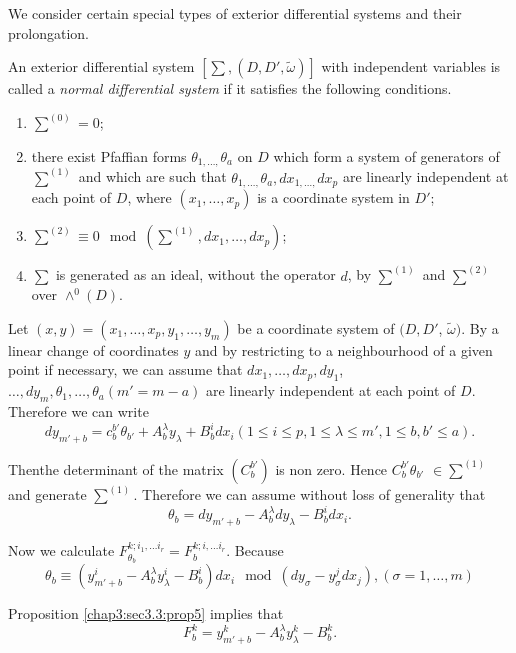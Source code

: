 We consider certain special types of exterior differential systems and
their prolongation. 

\begin{defi*}%
  An exterior differential system $[\sum , (D, D', \tilde{\omega})]$
  with independent variables is called a {\em normal differential
    system } if it satisfies the following conditions. 
\end{defi*}

\begin{enumerate}[(1)]
\item $\sum ^{(0)} = 0$; 
\item there exist Pfaffian forms $\theta_{1, \ldots ,} \theta_a$ on
  $D$ which form a system of generators of $\sum^{(1)}$ and which are
  such that $\theta_{1, \ldots ,} \theta_a , dx_{1, \ldots ,} dx_p$
  are linearly independent at each point of $D$, where $(x_{1}, \ldots
  , x_p)$ is a coordinate system in $D'$; 
\item $\sum^{(2)} \equiv 0 \mod (\sum^{(1)}, dx_1 , \ldots , dx_p)$;
\item $\sum$ is generated as an ideal, without the operator $d$, by
  $\sum^{(1)}$ and $\sum^{(2)}$ over $\wedge^0 (D)$. 
\end{enumerate}

Let $(x, y) = (x_1, \ldots , x_p , y_1 , \ldots , y_m)$ be a
coordinate system of $(D, D'$, $\tilde{\omega})$. By a linear change of
coordinates $y$ and by restricting to a neighbourhood of a given point
if necessary, we can assume that $dx_1, \ldots , dx_p, dy_1$, $\ldots ,
dy_m , \theta_1, \ldots , \theta_a (m' = m-a)$ are linearly
independent at each point of $D$. Therefore we can write	 
$$
dy_{m' + b} = c^{b'}_b \theta_{b'} + A^{\lambda}_b y_{\lambda} + B^i_b
dx_i (1 \leq i \leq p, 1 \leq \lambda \leq m', 1 \leq b, b' \leq a). 
$$

Then\pageoriginale the determinant of the matrix $(C_b^{b'})$ is non zero. Hence
$C_b^{b'} \theta_{b'}$ $\in \sum ^{(1)}$ and generate $\sum^{(1)}$. Therefore
we can assume without loss of generality  that 
$$
\theta_b = dy_{m'+b} - A_b^{\lambda}dy_{\lambda} - B^i_b dx_i.
$$

Now we calculate $F_{\theta_{b}}^{k;i_1, \ldots i_r} = F_b^{k;i, \ldots i_r}$. Because 
$$
\theta_b \equiv (y^i_{m'+b} - A^{\lambda}_b y^i_{\lambda} - B^i_b ) dx_i \mod
(dy_{\sigma} - y^j_{\sigma} dx_j ) , (\sigma = 1 , \ldots , m) 
$$

Proposition \ref{chap3:sec3.3:prop5} implies that
$$
F^k _b = y^k_{m' +b}- A ^{\lambda}_b y_{\lambda}^k - B^k_b.
$$

